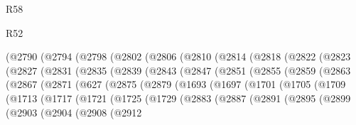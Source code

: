 \begin{lexlean}{R58}
\begin{lexlean}{R52}
\begin{coremodule}
{{{{{{{{{{{{{{{{{{{{{{{{{{{{{{{{{{{{{{{{{{{{{{{{{{{{{{{{{{{{{{{{{{{{{{{{{{{{{{{{{{{{{{{{{{{{{{{{{{{{{{{{{{{{{{{{{{{{{{{{{{{{{{{{{{{{{{{{{{{{{{{{{{{{{{{{{{{{{{{{{{{{{{{{{{{{{{{{{{{{{{{{{{{{{{{{{{{{{{          (@2790
            (@2794
              (@2798
                (@2802
                  (@2806
                    (@2810
                      (@2814
                        (@2818
                          (@2822
                            (@2823
                              (@2827
                                (@2831
                                  (@2835
                                    (@2839
                                      (@2843
                                        (@2847
                                          (@2851
                                            (@2855
                                              (@2859
                                                (@2863
                                                  (@2867
                                                    (@2871
                                                      (@627
                                                        (@2875
                                                          (@2879
                                                            (@1693
                                                              (@1697
                                                                (@1701
                                                                  (@1705
                                                                    (@1709
                                                                      (@1713
                                                                        (@1717
                                                                          (@1721
                                                                            (@1725
                                                                              (@1729
                                                                                (@2883
                                                                                  (@2887
                                                                                    (@2891
                                                                                      (@2895
                                                                                        (@2899
                                                                                          (@2903
                                                                                            (@2904
                                                                                              (@2908
                                                                                                (@2912
}}}}}}}}}}}}}}}}}}}}}}}}}}}}}}}}}}}}}}}}}}}}}}}}}}}}}}}}}}}}}}}}}}}}}}}}}}}}}}}}}}}}}}}}}}}}}}}}}}}}}}}}}}}}}}}}}}}}}}}}}}}}}}}}}}}}}}}}}}}}}}}}}}}}}}}}}}}}}}}}}}}}}}}}}}}}}}}}}}}}}}}}}}}}}}}}}}}}}}
\end{coremodule}
\end{lexlean}
\end{lexlean}
